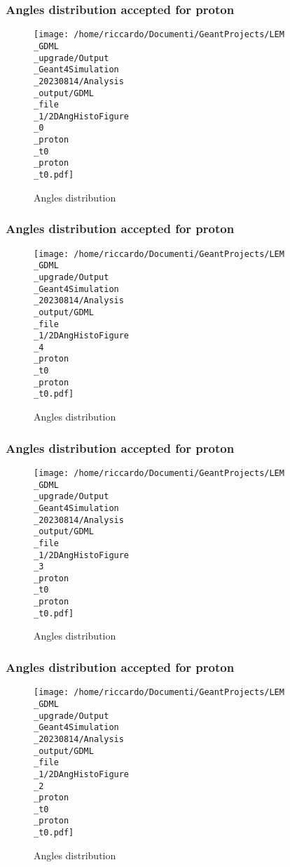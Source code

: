 \documentclass[8pt]{beamer}
\begin{document}
            \begin{frame}
                \frametitle{Angles distribution accepted for proton}
            
        \begin{figure}[h]
            \centering
            \texttt{[image: /home/riccardo/Documenti/GeantProjects/LEM\\\_GDML\\\_upgrade/Output\\\_Geant4Simulation\\\_20230814/Analysis\\\_output/GDML\\\_file\\\_1/2DAngHistoFigure\\\_0\\\_proton\\\_t0\\\_proton\\\_t0.pdf]}
            \caption{Angles distribution}
        \end{figure}
        
            \end{frame}
            
            \begin{frame}
                \frametitle{Angles distribution accepted for proton}
            
        \begin{figure}[h]
            \centering
            \texttt{[image: /home/riccardo/Documenti/GeantProjects/LEM\\\_GDML\\\_upgrade/Output\\\_Geant4Simulation\\\_20230814/Analysis\\\_output/GDML\\\_file\\\_1/2DAngHistoFigure\\\_4\\\_proton\\\_t0\\\_proton\\\_t0.pdf]}
            \caption{Angles distribution}
        \end{figure}
        
            \end{frame}
            
            \begin{frame}
                \frametitle{Angles distribution accepted for proton}
            
        \begin{figure}[h]
            \centering
            \texttt{[image: /home/riccardo/Documenti/GeantProjects/LEM\\\_GDML\\\_upgrade/Output\\\_Geant4Simulation\\\_20230814/Analysis\\\_output/GDML\\\_file\\\_1/2DAngHistoFigure\\\_3\\\_proton\\\_t0\\\_proton\\\_t0.pdf]}
            \caption{Angles distribution}
        \end{figure}
        
            \end{frame}
            
            \begin{frame}
                \frametitle{Angles distribution accepted for proton}
            
        \begin{figure}[h]
            \centering
            \texttt{[image: /home/riccardo/Documenti/GeantProjects/LEM\\\_GDML\\\_upgrade/Output\\\_Geant4Simulation\\\_20230814/Analysis\\\_output/GDML\\\_file\\\_1/2DAngHistoFigure\\\_2\\\_proton\\\_t0\\\_proton\\\_t0.pdf]}
            \caption{Angles distribution}
        \end{figure}
        
            \end{frame}
            
\end{document}
